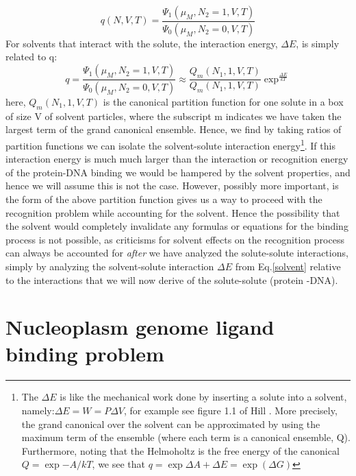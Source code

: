 \begin{equation}\label{}
  q(N,V,T) = \frac{ \Psi_1(\mu_M,N_2=1,V,T) }{\Psi_0(\mu_M,N_2=0,V,T)}
\end{equation}
For solvents that interact with the solute, the interaction energy, $\Delta E$, is simply related to q:
\begin{equation}\label{solvent}
  q= \frac{ \Psi_1(\mu_M,N_2=1,V,T) }{\Psi_0(\mu_M,N_2=0,V,T)} \approx \frac{Q_m(N_1,1,V,T)}{Q_m(N_1,1,V,T)}\exp^{\frac{\Delta E}{kT}}
\end{equation}
here, $Q_m(N_1,1,V,T)$ is the canonical partition function for one solute in a box of size V of solvent particles, where the subscript m indicates we have taken the largest term of the grand canonical ensemble.  Hence, we find by taking ratios of partition functions we can isolate the solvent-solute interaction energy\footnote{The $\Delta E$ is like the mechanical work done by inserting a solute into a solvent, namely:$\Delta E =W= P \Delta V$, for example see figure 1.1 of Hill \cite{hill}.  More precisely, the grand canonical over the solvent can be approximated by using the maximum term of the ensemble (where each term is a canonical ensemble, Q).  Furthermore, noting that the Helmoholtz is the free energy of the canonical $Q=\exp{-A/kT}$, we see that $q=\exp{\Delta A +\Delta E } = \exp(\Delta G)$ }.  If this interaction energy is much much larger than the interaction or recognition energy of the protein-DNA binding we would be hampered by the solvent properties, and hence we will assume this is not the case.  However, possibly more important, is the form of the above partition function gives us a way to proceed with the recognition problem while accounting for the solvent.  Hence the possibility that the solvent would completely invalidate any formulas or equations for the binding process is not possible, as criticisms for solvent effects on the recognition process can always be accounted for \emph{after} we have analyzed the solute-solute interactions, simply by analyzing the solvent-solute interaction $\Delta E$ from Eq.\ref{solvent} relative to the interactions that we will now derive of the solute-solute (protein -DNA).

  

\section*{Nucleoplasm genome ligand binding problem}

